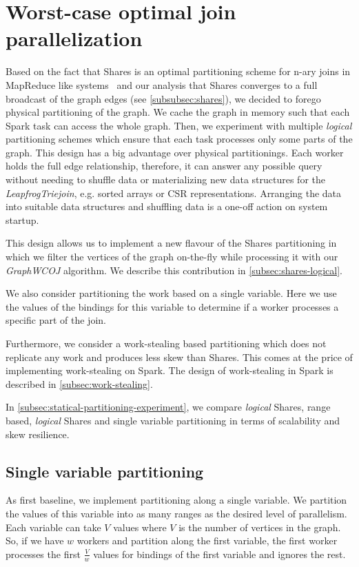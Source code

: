 \section{Worst-case optimal join parallelization}\label{sec:worst-case-optimal-join-parallelization}  %
Based on the fact that Shares is an optimal partitioning scheme for n-ary joins in MapReduce like systems~\cite{shares} and
our analysis that Shares converges to a full broadcast of the graph edges (see \cref{subsubsec:shares}), we decided
to forego physical partitioning of the graph.
We cache the graph in memory such that each Spark task can access the whole graph.
Then, we experiment with multiple \textit{logical} partitioning schemes which ensure that each task processes
only some parts of the graph.
This design has a big advantage over physical partitionings.
Each worker holds the full edge relationship, therefore, it can answer any possible query without needing to shuffle data or
materializing new data structures for the \textit{LeapfrogTriejoin}, e.g. sorted arrays or CSR representations.
Arranging the data into suitable data structures and shuffling data is a one-off action on system startup.

This design allows us to implement a new flavour of the Shares partitioning in which we filter the vertices of the
graph on-the-fly while processing it with our \textit{GraphWCOJ} algorithm.
We describe this contribution in \cref{subsec:shares-logical}.

We also consider partitioning the work based on a single variable.
Here we use the values of the bindings for this variable to determine if a worker processes a specific part of the join.

Furthermore, we consider a work-stealing based partitioning which does not replicate any work and produces less
skew than Shares. %
This comes at the price of implementing work-stealing on Spark.
The design of work-stealing in Spark is described in \cref{subsec:work-stealing}.

In \cref{subsec:statical-partitioning-experiment}, we compare \textit{logical} Shares, range based, \textit{logical} Shares
and single variable partitioning in terms of scalability and skew resilience.

\subsection{Single variable partitioning} \label{subsec:single-variable-partitioning}
As first baseline, we implement partitioning along a single variable.
We partition the values of this variable into as many ranges as the desired level of parallelism.
Each variable can take $V$ values where $V$ is the number of vertices in the graph.
So, if we have $w$ workers and partition along the first variable, the first worker processes the first $\frac{V}{w}$ values for
bindings of the first variable and ignores the rest.

